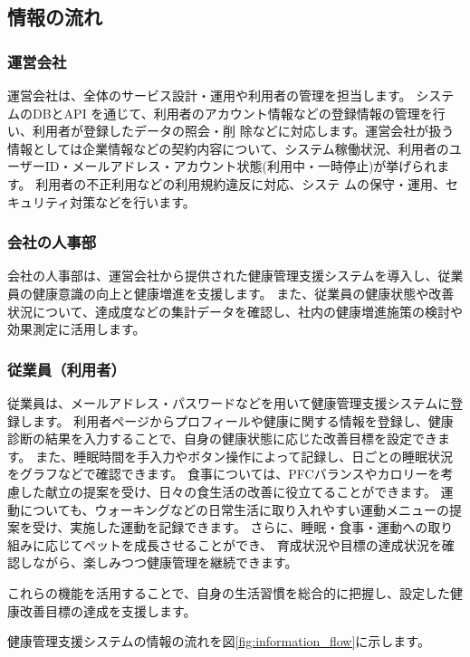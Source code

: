 \documentclass[uplatex,dvipdfmx]{jlreq}
\begin{document}
\subsection{情報の流れ}
\subsubsection{運営会社}
運営会社は、全体のサービス設計・運用や利用者の管理を担当します。
システムのDBとAPI を通じて、利用者のアカウント情報などの登録情報の管理を行い、利用者が登録したデータの照会・削 除などに対応します。運営会社が扱う情報としては企業情報などの契約内容について、システム稼働状況、利用者のユーザーID・メールアドレス・アカウント状態(利用中・一時停止)が挙げられます。
利用者の不正利用などの利用規約違反に対応、システ ムの保守・運用、セキュリティ対策などを行います。

\subsubsection{会社の人事部}
会社の人事部は、運営会社から提供された健康管理支援システムを導入し、従業員の健康意識の向上と健康増進を支援します。
また、従業員の健康状態や改善状況について、達成度などの集計データを確認し、社内の健康増進施策の検討や効果測定に活用します。


\subsubsection{従業員（利用者）}
従業員は、メールアドレス・パスワードなどを用いて健康管理支援システムに登録します。
利用者ページからプロフィールや健康に関する情報を登録し、健康診断の結果を入力することで、自身の健康状態に応じた改善目標を設定できます。
また、睡眠時間を手入力やボタン操作によって記録し、日ごとの睡眠状況をグラフなどで確認できます。
食事については、PFCバランスやカロリーを考慮した献立の提案を受け、日々の食生活の改善に役立てることができます。
運動についても、ウォーキングなどの日常生活に取り入れやすい運動メニューの提案を受け、実施した運動を記録できます。
さらに、睡眠・食事・運動への取り組みに応じてペットを成長させることができ、
育成状況や目標の達成状況を確認しながら、楽しみつつ健康管理を継続できます。

これらの機能を活用することで、自身の生活習慣を総合的に把握し、設定した健康改善目標の達成を支援します。

\vspace{0.5cm}

健康管理支援システムの情報の流れを図\ref{fig:information_flow}に示します。
\end{document}
